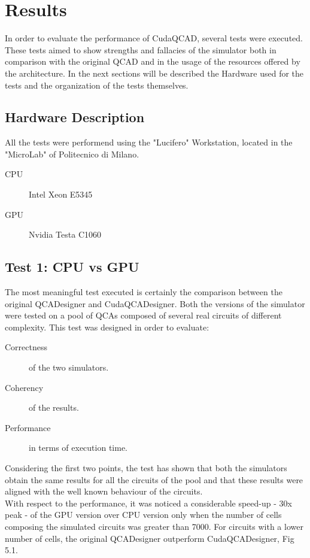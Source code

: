 \chapter{Results}\label{sec:results}
In order to evaluate the performance of CudaQCAD, several tests were executed. These tests aimed to show strengths and fallacies of the simulator both in comparison with the original QCAD and in the usage of the resources offered by the architecture. In the next sections will be described the Hardware used for the tests and the organization of the tests themselves.

\section{Hardware Description}
All the tests were performend using the "Lucifero" Workstation, located in the "MicroLab" of Politecnico di Milano. \\
\begin{description}
\item[CPU] Intel Xeon E5345
\item[GPU] Nvidia Testa C1060
\end{description} 

\section{Test 1: CPU vs GPU}
The most meaningful test executed is certainly the comparison between the original QCADesigner and CudaQCADesigner. Both the versions of the simulator were tested on a pool of QCAs composed of several real circuits of different complexity. This test was designed in order to evaluate:

\begin{description}
\item[Correctness] of the two simulators.
\item[Coherency] of the results.
\item[Performance] in terms of execution time.
\end{description}    

Considering the first two points, the test has shown that both the simulators obtain the same results for all the circuits of the pool and that these results were aligned with the well known behaviour of the circuits.\\
With respect to the performance, it was noticed a considerable speed-up - 30x peak - of the GPU version over CPU version only when the number of cells composing the simulated circuits was greater than 7000. For circuits with a lower number of cells, the original QCADesigner outperform CudaQCADesigner, Fig 5.1.
 
